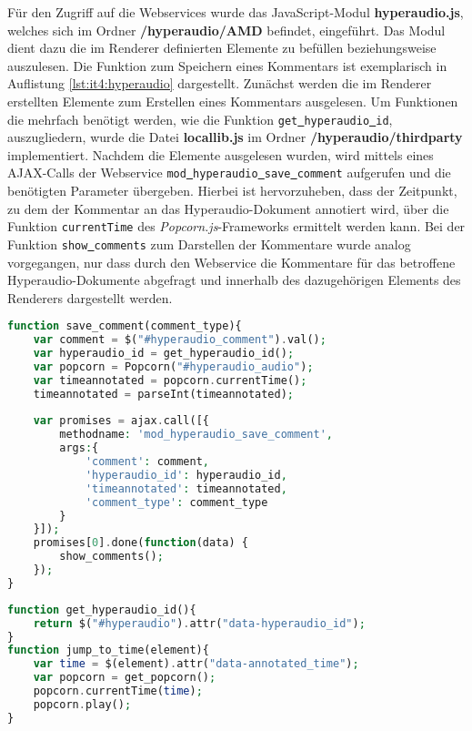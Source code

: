 Für den Zugriff auf die Webservices wurde das JavaScript-Modul \textbf{hyperaudio.js}, welches sich im Ordner \textbf{/hyperaudio/AMD} befindet, eingeführt. Das Modul dient dazu die im Renderer definierten Elemente zu befüllen beziehungsweise auszulesen.
Die Funktion zum Speichern eines Kommentars ist exemplarisch in Auflistung \ref{lst:it4:hyperaudio} dargestellt. Zunächst werden die im Renderer erstellten Elemente zum Erstellen eines Kommentars ausgelesen. Um Funktionen die mehrfach benötigt werden, wie die Funktion \texttt{get\underline{{ }}hyperaudio\underline{{ }}id},  auszugliedern, wurde die Datei \textbf{locallib.js} im Ordner \textbf{/hyperaudio/thirdparty} implementiert. Nachdem die Elemente ausgelesen wurden, wird mittels eines AJAX-Calls der Webservice \texttt{mod\underline{{ }}hyperaudio\underline{{ }}save\underline{{ }}comment} aufgerufen und die benötigten Parameter übergeben. Hierbei ist hervorzuheben, dass der Zeitpunkt, zu dem der Kommentar an das Hyperaudio-Dokument annotiert wird, über die Funktion \texttt{currentTime} des \textit{Popcorn.js}-Frameworks ermittelt werden kann. Bei der Funktion \texttt{show\underline{{ }}comments} zum Darstellen der Kommentare wurde analog vorgegangen, nur dass durch den Webservice die Kommentare für das betroffene Hyperaudio-Dokumente abgefragt und innerhalb des dazugehörigen Elements des Renderers dargestellt werden.


\begin{lstlisting}[language=php,
             linewidth=\textwidth,
             caption={Ausschnitt der \textbf{hyperaudio.js} in der 4. Iteration},
             label={lst:it4:hyperaudio}]
function save_comment(comment_type){
    var comment = $("#hyperaudio_comment").val();
    var hyperaudio_id = get_hyperaudio_id();
    var popcorn = Popcorn("#hyperaudio_audio");
    var timeannotated = popcorn.currentTime();
    timeannotated = parseInt(timeannotated);
	    
    var promises = ajax.call([{
        methodname: 'mod_hyperaudio_save_comment',
        args:{
            'comment': comment,
            'hyperaudio_id': hyperaudio_id,       
            'timeannotated': timeannotated,
            'comment_type': comment_type
        }
    }]);
    promises[0].done(function(data) {
        show_comments();
    });
}
\end{lstlisting}

\begin{lstlisting}[language=php,
             linewidth=\textwidth,
             caption={Ausschnitt der \textbf{locallib.js} in der 4. Iteration},
             label={lst:it4:locallib.js}]
function get_hyperaudio_id(){
    return $("#hyperaudio").attr("data-hyperaudio_id");
}
function jump_to_time(element){
    var time = $(element).attr("data-annotated_time");
    var popcorn = get_popcorn();
    popcorn.currentTime(time);
    popcorn.play();
}
\end{lstlisting}

